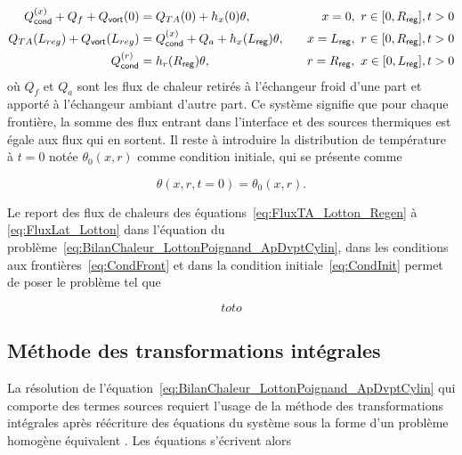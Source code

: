 \begin{subequations}
	\begin{align}
		Q_{\sf cond}^{(x)} + Q_f + Q_{\sf vort}(0) &= Q_{TA}(0) + h_x(0)\theta,\quad &x=0,\ r \in [0,R_{\sf reg}], t>0 \label{eq:CondFront_x_0Froid}\\%
		Q_{TA}(L_{reg}) + Q_{\sf vort}(L_{reg})  &= Q_{\sf cond}^{(x)} + Q_a + h_x(L_{\sf reg})\theta, \quad &x=L_{\sf reg},\ r \in [0,R_{\sf reg}], t>0 \label{eq:CondFront_x_LregAmb}\\%
		Q_{\sf cond}^{(r)} &= h_r(R_{\sf reg})\theta, \quad &r=R_{\sf reg},\ x \in [0,L_{\sf reg}], t>0 \label{eq:CondFront_r_ra}
	\end{align}%
	\label{eq:CondFront}%
\end{subequations}
où $Q_f$ et $Q_a$ sont les flux de chaleur retirés à l'échangeur froid d'une part et apporté à l'échangeur ambiant d'autre part. Ce système signifie que pour chaque frontière, la somme des flux entrant dans l'interface et des sources thermiques est égale aux flux qui en sortent. Il reste à introduire la distribution de température à $t=0$ notée $\theta_0(x,r)$ comme condition initiale, qui se présente comme

\begin{equation}
	\theta(x,r,t=0) = \theta_0(x,r).
	\label{eq:CondInit}
\end{equation}

Le report des flux de chaleurs des équations~\eqref{eq:FluxTA_Lotton_Regen} à \eqref{eq:FluxLat_Lotton} dans l'équation du problème~\eqref{eq:BilanChaleur_LottonPoignand_ApDvptCylin}, dans les conditions aux frontières~\eqref{eq:CondFront} et dans la condition initiale~\eqref{eq:CondInit} permet de poser le problème tel que

\begin{equation}
	toto
	\label{eq:ProbTransitoire_ApDvpt}
\end{equation}

\subsection{Méthode des transformations intégrales}\label{chap:TransfoIntegrales}
La résolution de l'équation~\eqref{eq:BilanChaleur_LottonPoignand_ApDvptCylin} qui comporte des termes sources requiert l'usage de la méthode des transformations intégrales après réécriture des équations du système sous la forme d'un problème homogène équivalent \cite{ozisik_heat_1993}. Les équations s'écrivent alors

